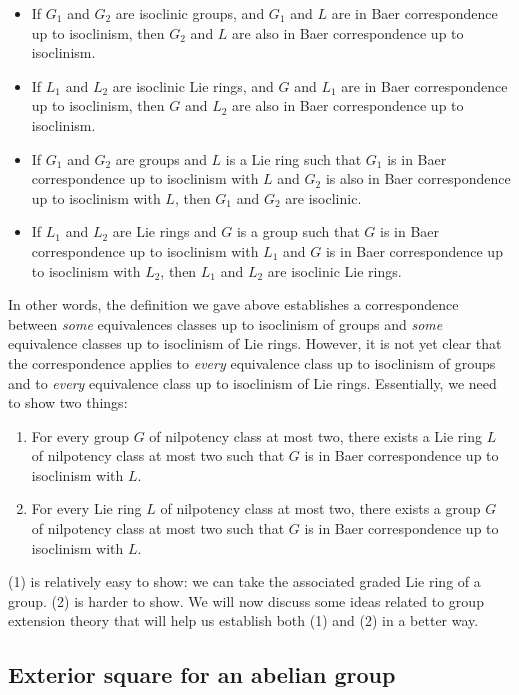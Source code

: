 \begin{itemize}
\item If $G_1$ and $G_2$ are isoclinic groups, and $G_1$ and $L$ are
  in Baer correspondence up to isoclinism, then $G_2$ and $L$ are also
  in Baer correspondence up to isoclinism.
\item If $L_1$ and $L_2$ are isoclinic Lie rings, and $G$ and $L_1$
  are in Baer correspondence up to isoclinism, then $G$ and $L_2$ are
  also in Baer correspondence up to isoclinism.
\item If $G_1$ and $G_2$ are groups and $L$ is a Lie ring such that
  $G_1$ is in Baer correspondence up to isoclinism with $L$ and $G_2$
  is also in Baer correspondence up to isoclinism with $L$, then $G_1$
  and $G_2$ are isoclinic.
\item If $L_1$ and $L_2$ are Lie rings and $G$ is a group such that
  $G$ is in Baer correspondence up to isoclinism with $L_1$ and $G$ is
  in Baer correspondence up to isoclinism with $L_2$, then $L_1$ and
  $L_2$ are isoclinic Lie rings.
\end{itemize}


In other words, the definition we gave above establishes a
correspondence between {\em some} equivalences classes up to
isoclinism of groups and {\em some} equivalence classes up to
isoclinism of Lie rings. However, it is not yet clear that the
correspondence applies to {\em every} equivalence class up to
isoclinism of groups and to {\em every} equivalence class up to
isoclinism of Lie rings. Essentially, we need to show two things:

\begin{enumerate}
\item For every group $G$ of nilpotency class at most two, there
  exists a Lie ring $L$ of nilpotency class at most two such that $G$
  is in Baer correspondence up to isoclinism with $L$.
\item For every Lie ring $L$ of nilpotency class at most two, there
  exists a group $G$ of nilpotency class at most two such that $G$ is
  in Baer correspondence up to isoclinism with $L$.
\end{enumerate}

(1) is relatively easy to show: we can take the associated graded Lie
ring of a group. (2) is harder to show. We will now discuss some ideas
related to group extension theory that will help us establish both (1)
and (2) in a better way.

\subsection{Exterior square for an abelian group}\label{sec:exteriorsquare-abelian-group-proofs}

